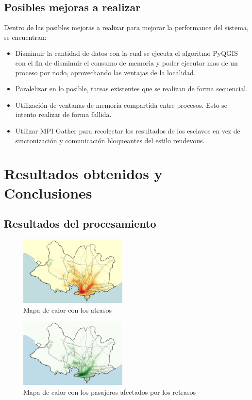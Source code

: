 \documentclass[journal]{IEEEtran}
\begin{document}
\subsection{Posibles mejoras a realizar}
Dentro de las posibles mejoras a realizar para mejorar la performance del sistema, se encuentran:
\begin{itemize}
\item Disminuir la cantidad de datos con la cual se ejecuta el algoritmo PyQGIS con el fin de disminuir el consumo de memoria y poder ejecutar mas de un proceso por nodo, aprovechando las ventajas de la localidad.
\item Paralelizar en lo posible, tareas existentes que se realizan de forma secuencial.
\item Utilización de ventanas de memoria compartida entre procesos. Esto se intento realizar de forma fallida.
\item Utilizar MPI Gather para recolectar los resultados de los esclavos en vez de sincronización y comunicación bloqueantes del estilo rendevous.
\end{itemize}

\section{Resultados obtenidos y Conclusiones}
\subsection{Resultados del procesamiento}

\begin{figure}[h]
    \centering
    \includegraphics[width=0.48\textwidth]{Retraso2}
    \caption{Mapa de calor con los atrasos}
    \label{fig:map1}
\end{figure}
\begin{figure}[h]
    \centering
    \includegraphics[width=0.48\textwidth]{Pasajeros_v2}
    \caption{Mapa de calor con los pasajeros afectados por los retrasos}
    \label{fig:map2}
\end{figure}
\end{document}
